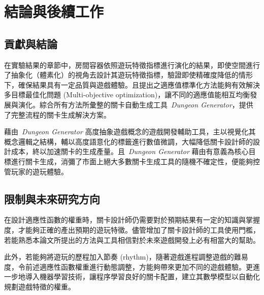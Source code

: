 \chapter{結論與後續工作}
\label{cha:conclusions}

\section{貢獻與結論}

在實驗結果的章節中，房間容器依照遊玩特徵指標進行演化的結果，即使空間進行了抽象化（體素化）的視角去設計其遊玩特徵指標，驗證即使精確度降低的情形下，確保結果具有一定品質與遊戲體驗。且提出之適應值標準化方法能夠有效解決多目標最佳化問題 (Multi-objective optimization)，讓不同的適應值能相互均衡發展與演化。綜合所有方法所彙整的關卡自動生成工具~\textit{Dungeon Generator}，提供了完整流程的關卡生成解決方案。


藉由~\textit{Dungeon Generator} 高度抽象遊戲概念的遊戲開發輔助工具，主以視覺化其概念邏輯之結構，輔以高度語意化的標籤進行數值微調，大幅降低關卡設計師的設計成本，終以加速關卡的生成產量。且~\textit{Dungeon Generator} 藉由有意義為核心目標進行關卡生成，消彌了市面上絕大多數關卡生成工具的隨機不確定性，便能夠控管玩家的遊玩體驗。

\section{限制與未來研究方向} 

在設計適應性函數的權重時，關卡設計師仍需要對於預期結果有一定的知識與掌握度，才能夠正確的產出預期的遊玩特徵。儘管增加了關卡設計師的工具使用門檻，若能熟悉本論文所提出的方法與工具相信對於未來遊戲開發上必有相當大的幫助。

此外，若能夠將遊玩的歷程加入節奏 (rhythm)，隨著遊戲進程調整遊戲的難易度，令前述適應性函數權重進行動態調整，方能夠帶來更加不同的遊戲體驗。更進一步地導入機器學習技術，讓程序學習良好的關卡配置，建立其數學模型以自動化規劃遊戲特徵的權重。